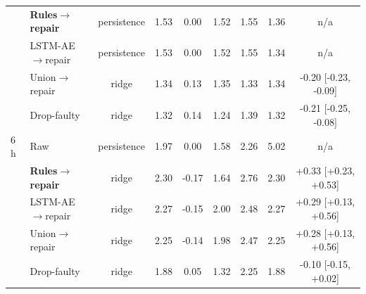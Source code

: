 \begin{table}[!t]
\begin{center}
\begin{tabular}{llccccccc}
 & \textbf{Rules$\rightarrow$repair} & persistence & 1.53 & 0.00 & 1.52 & 1.55 & 1.36 & n/a \\
 & LSTM-AE$\rightarrow$repair & persistence & 1.53 & 0.00 & 1.52 & 1.55 & 1.34 & n/a \\
 & Union$\rightarrow$repair & ridge & 1.34 & 0.13 & 1.35 & 1.33 & 1.34 & -0.20 [-0.23, -0.09] \\
 & Drop-faulty & ridge & 1.32 & 0.14 & 1.24 & 1.39 & 1.32 & -0.21 [-0.25, -0.08] \\
\midrule
6 h & Raw & persistence & 1.97 & 0.00 & 1.58 & 2.26 & 5.02 & n/a \\
 & \textbf{Rules$\rightarrow$repair} & ridge & 2.30 & -0.17 & 1.64 & 2.76 & 2.30 & +0.33 [+0.23, +0.53] \\
 & LSTM-AE$\rightarrow$repair & ridge & 2.27 & -0.15 & 2.00 & 2.48 & 2.27 & +0.29 [+0.13, +0.56] \\
 & Union$\rightarrow$repair & ridge & 2.25 & -0.14 & 1.98 & 2.47 & 2.25 & +0.28 [+0.13, +0.56] \\
 & Drop-faulty & ridge & 1.88 & 0.05 & 1.32 & 2.25 & 1.88 & -0.10 [-0.15, +0.02] \\
\bottomrule
\end{tabular}
\end{center}
\end{table}
